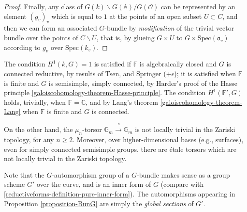 \begin{proof}
Finally, any class of $G(k)\backslash G(\mathbb A)/G(\mathcal O)$ can be represented by an element $(g_v)_v$ which is equal to $1$ at the points of an open subset $U\subset C$, and then we can form an associated $G$-bundle by \emph{modification} of the trivial vector bundle over the points of $C\smallsetminus U$, that is, by glueing $G\times U$ to $G\times \text{Spec}(\mathfrak o_v)$ according to $g_v$ over $\text{Spec}(k_v)$. 
\end{proof}



\begin{remark}
\label{remark-vanishing-cohomology}
The condition $H^1(k,G)=1$ is satisfied if $\mathbb F$ is algebraically closed and $G$ is connected reductive, by results of Tsen, and Springer ($+\epsilon$); it is satisfied when $\mathbb F$ is finite and $G$ is semisimple, simply connected, by Harder's proof of the Hasse principle \ref{galoiscohomology-theorem-Hasse-principle}. The condition $H^1(\mathbb F',G)$ holds, trivially, when $\mathbb F = \mathbb C$, and by Lang's theorem \ref{galoiscohomology-theorem-Lang} when $\mathbb F$ is finite and $G$ is connected.

On the other hand, the $\mu_n$-torsor $\mathbb G_m\xrightarrow{~^n}\mathbb G_m$ is not locally trivial in the Zariski topology, for  any $n\ge 2$. Moreover, over higher-dimensional bases (e.g., surfaces), even for simply connected semisimple groups, there are \'etale torsors which are not locally trivial in the Zariski topology.
\end{remark}

\begin{remark}
 \label{remark-automorphism-group}
Note that the $G$-automorphism group of a $G$-bundle makes sense as a group scheme $G'$ over the curve, and is an inner form of $G$ (compare with \ref{reductiveforms-definition-pure-inner-form}). The automorphisms appearing in Proposition \ref{proposition-BunG} are simply the \emph{global sections} of $G'$.
\end{remark}

